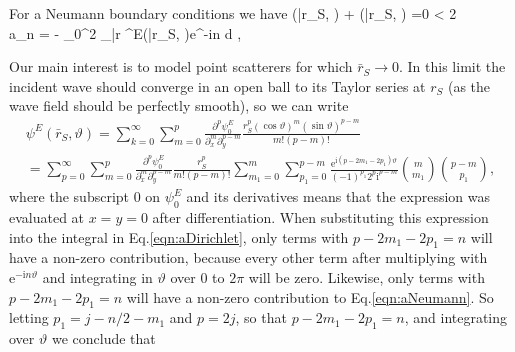 \documentclass[ 12pt, a4paper]{article}
\def\bga#1\ega{\begin{gather}#1\end{gather}} %
\newcommand{\ii}{\textrm{i}}
\newcommand{\ee}{\textrm{e}}
\begin{document}
For a Neumann boundary conditions we have
\bga
\frac{\partial \psi^E}{\partial \bar r}(\bar r_S, \theta) + (\bar r_S, \theta) =0  \;\;  \leq \theta < 2 \pi  \implies
\\
  a_n  = - \int_{0}^{2 \pi}\partial_{\bar r} \psi^E(\bar r_S, \theta)\ee^{-\ii n \theta} d \theta,
\label{eqn:aNeumann}
\ega

Our main interest is to model point scatterers for which $\bar r_S \to 0$. In this limit the incident wave should converge in an open ball to its Taylor series at $r_S$  (as the wave field should be perfectly smooth), so we can write
\begin{multline}
\psi^E(\bar r_S, \vartheta) =  \sum_{k= 0}^\infty \sum_{m= 0}^p \frac{\partial^p \psi^E_0}{\partial_{x}^m \partial_{y}^{p-m}}   \frac{ r_S^p (\cos \vartheta)^m (\sin \vartheta)^{p-m} }{m! (p-m)!}
\\
= \sum_{p= 0}^\infty \sum_{m= 0}^p \frac{\partial^p \psi^E_0}{\partial_{x}^m \partial_{ y}^{p-m}}  \frac{ r_S^p  }{m! (p-m)!} \sum_{m_1= 0}^m \sum_{p_1= 0}^{p-m} \frac{\ee^{\ii (p-2 m_1-2 p_1)\vartheta}   }{(-1)^{p_1} 2^p \ii^{p-m} } \binom{m}{m_1} \binom{p-m}{p_1},
\label{eqn:PsiTaylor}
\end{multline}
where the subscript $0$ on $\psi^E_0$ and its derivatives means that the expression was evaluated at $x=y=0$ after differentiation. When substituting this expression into the integral in Eq.\eqref{eqn:aDirichlet}, only terms with $p-2 m_1-2 p_1 =n$ will have a non-zero contribution, because every other term  after multiplying with $\ee^{-\ii n \vartheta}$ and integrating in $\vartheta$ over $0$ to $2 \pi$ will be zero. Likewise, only terms with $p-2 m_1-2 p_1 =n$ will have a non-zero contribution to Eq.\eqref{eqn:aNeumann}.
So letting $p_1 =  j-n/2- m_1$ and $p = 2 j$, so that  $p-2 m_1-2 p_1 =n$, and integrating over $\vartheta$ we conclude that
\end{document}
